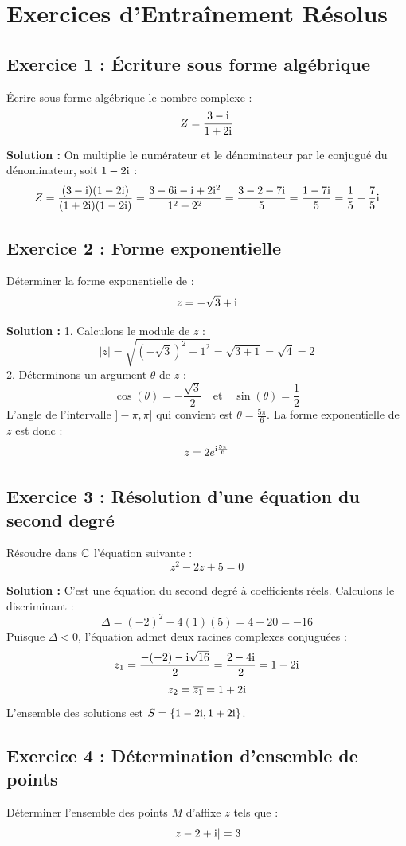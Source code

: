 \section{Exercices d'Entraînement Résolus}

\subsection*{Exercice 1 : Écriture sous forme algébrique}
Écrire sous forme algébrique le nombre complexe :
\[
Z = \frac{3-\mathrm{i}}{1+2\mathrm{i}}
\]

\textbf{Solution :}
On multiplie le numérateur et le dénominateur par le conjugué du dénominateur, soit $1-2\mathrm{i}$ :
\[
Z = \frac{(3-\mathrm{i})(1-2\mathrm{i})}{(1+2\mathrm{i})(1-2\mathrm{i})} = \frac{3 - 6\mathrm{i} - \mathrm{i} + 2\mathrm{i}^2}{1^2 + 2^2} = \frac{3 - 2 - 7\mathrm{i}}{5} = \frac{1-7\mathrm{i}}{5} = \frac{1}{5} - \frac{7}{5}\mathrm{i}
\]

\subsection*{Exercice 2 : Forme exponentielle}
Déterminer la forme exponentielle de :
\[
z = -\sqrt{3} + \mathrm{i}
\]

\textbf{Solution :}
1. Calculons le module de $z$ :
   \[
   |z| = \sqrt{(-\sqrt{3})^2 + 1^2} = \sqrt{3+1} = \sqrt{4} = 2
   \]
2. Déterminons un argument $\theta$ de $z$ :
   \[
   \cos(\theta) = -\frac{\sqrt{3}}{2} \quad \text{et} \quad \sin(\theta) = \frac{1}{2}
   \]
   L'angle de l'intervalle $]-\pi, \pi]$ qui convient est $\theta = \frac{5\pi}{6}$.
La forme exponentielle de $z$ est donc :
\[
z = 2 e^{\mathrm{i}\frac{5\pi}{6}}
\]

\subsection*{Exercice 3 : Résolution d'une équation du second degré}
Résoudre dans $\mathbb{C}$ l'équation suivante :
\[
z^2 - 2z + 5 = 0
\]

\textbf{Solution :}
C'est une équation du second degré à coefficients réels. Calculons le discriminant :
\[
\Delta = (-2)^2 - 4(1)(5) = 4 - 20 = -16
\]
Puisque $\Delta < 0$, l'équation admet deux racines complexes conjuguées :
\[
z_1 = \frac{-(-2) - \mathrm{i}\sqrt{16}}{2} = \frac{2 - 4\mathrm{i}}{2} = 1 - 2\mathrm{i}
\]
\[
z_2 = \overline{z_1} = 1 + 2\mathrm{i}
\]
L'ensemble des solutions est $S = \{1-2\mathrm{i}, 1+2\mathrm{i}\}$.

\subsection*{Exercice 4 : Détermination d'ensemble de points}
Déterminer l'ensemble des points $M$ d'affixe $z$ tels que :
\[
|z - 2 + \mathrm{i}| = 3
\]

